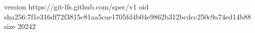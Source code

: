 version https://git-lfs.github.com/spec/v1
oid sha256:7f1e316df72f3815c81aa5cae1705fd4b04e9862b312bcdcc250c9a74ed14b88
size 20242
